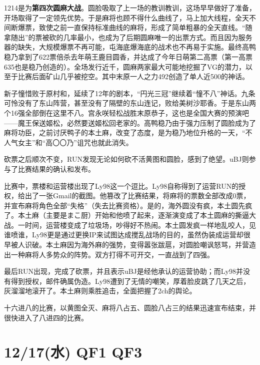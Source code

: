 1214是为\textbf{第四次圆麻大战}。圆脸吸取了上一场的教训教训，这场早早做好了准备，开场取得了一定领先优势。于是麻将也顾不得什么曲线了，马上加大线程，全天不间断爆票，致使之前一直保持标准曲线的麻将，形成了简单粗暴的全天直线。“随拿随出”的票被砍的几率最小，也成为了后期圆麻唯一的出票方式。而且因为服务器的缺失，大规模爆票不再可能，屯海底爆海底的战术也不再易于实施。最终高鸭稳乃拿到了622票倍杀去年萌王鹿目圆香，并达成了今年日萌第二高票（第一高票635也是稳乃创造的）。全场发行近千，圆麻两家最大可能地挖掘了VG的潜力，以至于比赛后面矿山几乎被挖空。其中末原一人之力492创造了单人近500的神话。

新子憧惜败于原村和，延续了12年的剧本，“円光三冠”继续着“憧不八”神话。九条可怜没有了东山阵营，甚至没有了隔壁的东山连记，败给美树沙耶香。于是东山两个16强全部倒在这里不八。宫永咲轻松战胜末原恭子，这也是全国大赛的预演吧——魔王保送姬松，必然要送姬松回老家的。高鸭稳乃由于强力压制了圆脸成为了麻将功臣，之前讨厌鸭子的本土麻，改变了态度，是为稳乃地位升格的一天，“不人气女主”和“高〇〇乃”诅咒也就此消失。

砍票之后顺次不变，RUN发现无论如何砍不活黄图和圆脸，感到了绝望。uBJ则参与了比赛结果的确认和发布。

比赛中，票楼和运营楼出现了Ly98这一个逗比。Ly98自称得到了运营RUN的授权，给出了一张Gmail的截图。他篡改了比赛结果，将麻将的票数全部改成0票，并宣布麻将角色全部“失格”（失去比赛资格）。是的，海外圆没有疯，本土圆先疯了。本土麻（主要是まこ厨）开始和他喷了起来，逐渐演变成了本土圆麻的撕逼大战。一时间，运营楼变成了垃圾场，吵得好不热闹。本土圆发疯一样地乱咬人，见谁喷谁，Ly98更是通过更换IP来试图达成搅乱战场的目的，虽然伪装成运营却很早被人识破。本土麻因为海外麻的强势，变得嚣张跋扈，对圆脸嘲讽怒骂，并营造出一种麻将人多势众的阵势。双方打得不可开交，一直战到了四强。

最后RUN出现，完成了砍票，并且表示uBJ是经他承认的运营协助；而Ly98并没有得到授权，邮件确属伪造。Ly98遭到了无情的嘲笑，厚着脸皮跳了几天之后，灰溜溜地滚开了。本土麻则乘胜追击，全面把握了2ch的舆论。

十六进八的比赛，以黄图全灭、麻将八占五、圆脸八占三的结果迅速宣布结束，并很快进入了八进四的比赛。

\section{12/17(水) QF1 QF3}

